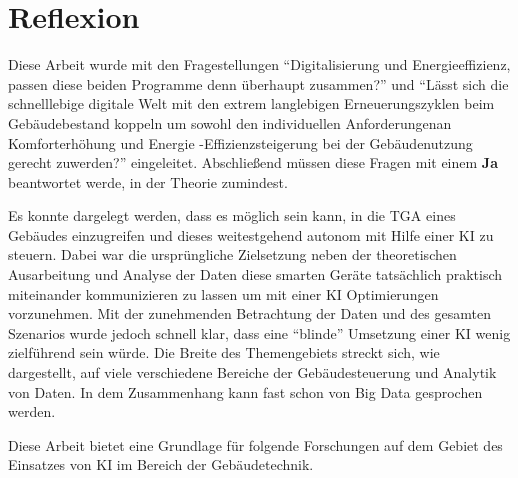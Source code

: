 \chapter{Reflexion}
Diese Arbeit wurde mit den Fragestellungen \enquote{Digitalisierung und Energieeffizienz, passen diese beiden Programme denn überhaupt zusammen?} und \enquote{Lässt sich die schnelllebige digitale Welt mit den extrem langlebigen Erneuerungszyklen beim Gebäudebestand koppeln um sowohl den individuellen Anforderungenan Komforterhöhung und Energie -Effizienzsteigerung bei der Gebäudenutzung gerecht zuwerden?} eingeleitet. Abschließend müssen diese Fragen mit einem \textbf{Ja} beantwortet werde, in der Theorie zumindest.

Es konnte dargelegt werden, dass es möglich sein kann, in die \gls{TGA} eines Gebäudes einzugreifen und dieses weitestgehend autonom mit Hilfe einer \gls{KI} zu steuern. Dabei war die ursprüngliche Zielsetzung neben der theoretischen Ausarbeitung und Analyse der Daten diese smarten Geräte tatsächlich praktisch miteinander kommunizieren zu lassen um mit einer \gls{KI} Optimierungen vorzunehmen. Mit der zunehmenden Betrachtung der Daten und des gesamten Szenarios wurde jedoch schnell klar, dass eine \enquote{blinde} Umsetzung einer \gls{KI} wenig zielführend sein würde. Die Breite des Themengebiets streckt sich, wie dargestellt, auf viele verschiedene Bereiche der Gebäudesteuerung und Analytik von Daten. In dem Zusammenhang kann fast schon von Big Data gesprochen werden.

Diese Arbeit bietet eine Grundlage für folgende Forschungen auf dem Gebiet des Einsatzes von \gls{KI} im Bereich der Gebäudetechnik.